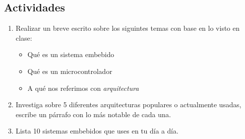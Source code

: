 \documentclass[11pt,letterpaper]{article}
\begin{document}
\subsection*{Actividades}
\begin{enumerate}[label=\arabic*)]
    \item Realizar un breve escrito sobre los siguintes temas con base en lo visto en clase:
    \begin{itemize}
        \item Qué es un sistema embebido
        \item Qué es un microcontrolador
        \item A qué nos referimos con \textit{arquitectura}
    \end{itemize}
    \item Investiga sobre 5 diferentes arquitecturas populares o actualmente usadas, escribe un párrafo con lo más notable de cada una.
    \item Lista 10 sistemas embebidos que uses en tu día a día.
\end{enumerate}


    
    
    
    
  
\end{document}
